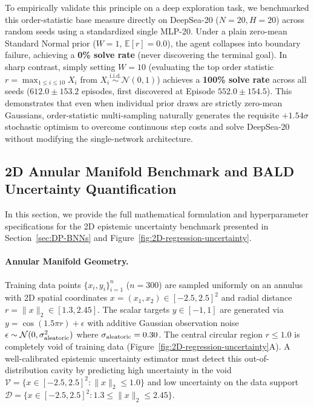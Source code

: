 \documentclass[10pt]{article}
\begin{document}
To empirically validate this principle on a deep exploration task, we benchmarked this order-statistic base measure directly on DeepSea-20 ($N=20, H=20$) across random seeds using a standardized single MLP-20. Under a plain zero-mean Standard Normal prior ($W=1$, $\mathbb{E}[r]=0.0$), the agent collapses into boundary failure, achieving a \textbf{0\% solve rate} (never discovering the terminal goal). In sharp contrast, simply setting $W=10$ (evaluating the top order statistic $r = \max_{1 \le i \le 10} X_i$ from $X_i \stackrel{\text{i.i.d.}}{\sim} \mathcal{N}(0, 1)$) achieves a \textbf{100\% solve rate} across all seeds ($612.0 \pm 153.2$ episodes, first discovered at Episode $552.0 \pm 154.5$). This demonstrates that even when individual prior draws are strictly zero-mean Gaussians, order-statistic multi-sampling naturally generates the requisite $+1.54\sigma$ stochastic optimism to overcome continuous step costs and solve DeepSea-20 without modifying the single-network architecture.

\subsection{2D Annular Manifold Benchmark and BALD Uncertainty Quantification}
\label{sec:bald-details}

In this section, we provide the full mathematical formulation and hyperparameter specifications for the 2D epistemic uncertainty benchmark presented in Section~\ref{sec:DP-BNNs} and Figure~\ref{fig:2D-regression-uncertainty}.

\paragraph{Annular Manifold Geometry.} Training data points $\{x_i, y_i\}_{i=1}^n$ ($n = 300$) are sampled uniformly on an annulus with 2D spatial coordinates $x = (x_1, x_2) \in [-2.5, 2.5]^2$ and radial distance $r = \|x\|_2 \in [1.3, 2.45]$. The scalar targets $y \in [-1, 1]$ are generated via $y = \cos(1.5\pi r) + \epsilon$ with additive Gaussian observation noise $\epsilon \sim \mathcal{N}(0, \sigma^2_{\rm aleatoric})$ where $\sigma_{\rm aleatoric} = 0.30$. The central circular region $r \le 1.0$ is completely void of training data (Figure~\ref{fig:2D-regression-uncertainty}A). A well-calibrated epistemic uncertainty estimator must detect this out-of-distribution cavity by predicting high uncertainty in the void $\mathcal{V} = \{x \in [-2.5, 2.5]^2 : \|x\|_2 \le 1.0\}$ and low uncertainty on the data support $\mathcal{D} = \{x \in [-2.5, 2.5]^2 : 1.3 \le \|x\|_2 \le 2.45\}$.
\end{document}
